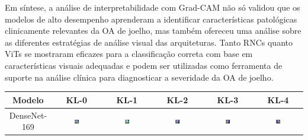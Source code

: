 Em síntese, a análise de interpretabilidade com Grad-CAM não só validou que os modelos de alto desempenho aprenderam a identificar características patológicas clinicamente relevantes da OA de joelho, mas também ofereceu uma análise sobre as diferentes estratégias de análise visual das arquiteturas. Tanto RNCs quanto ViTs se mostraram eficazes para a classificação correta com base em características visuais adequadas e podem ser utilizadas como ferramenta de suporte na análise clínica para diagnosticar a severidade da OA de joelho.

\begin{table}
    \centering
    \begin{tabular}{|c|c|c|c|c|c|}
        \hline
        \textbf{Modelo} & \textbf{KL-0} & \textbf{KL-1} & \textbf{KL-2} & \textbf{KL-3} & \textbf{KL-4} \\ \hline
        DenseNet-169 & \includegraphics[width=0.15\textwidth]{figs/gradcams/gradcam_densenet169_kl0.png} & \includegraphics[width=0.15\textwidth]{figs/gradcams/gradcam_densenet169_kl1.png} & \includegraphics[width=0.15\textwidth]{figs/gradcams/gradcam_densenet169_kl2.png} & \includegraphics[width=0.15\textwidth]{figs/gradcams/gradcam_densenet169_kl3.png} & \includegraphics[width=0.15\textwidth]{figs/gradcams/gradcam_densenet169_kl4.png} \\ \hline

\end{tabular}
\end{table}
